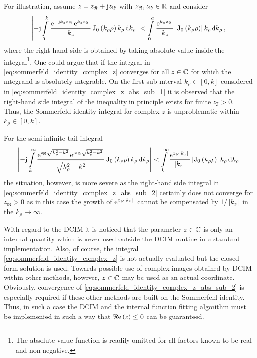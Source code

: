 For illustration, assume $z = z_\Re + \mathrm{j} z_\Im$ with $z_\Re, z_\Im \in \mathbb{R}$ and
consider
\begin{equation}\label{eq:sommerfeld_identity_complex_z_abs_sub_1}
	\left\vert
	-\mathrm{j}
	\int\limits_{0}^{k} 
	\frac{\mathrm{e}^{-\mathrm{j} k_z z_\Re}\, \mathrm{e}^{k_z z_\Im}\,}{k_z}
	\operatorname{J}_{0} \left(k_\rho \rho\right)
	k_\rho 
	\,
	\mathrm{d} k_\rho
	\right\vert
	<
	\int\limits_{0}^{a} 
	\frac{\mathrm{e}^{k_z z_\Im}\,}{k_z}
	\left\vert
	\operatorname{J}_{0} \left(k_\rho \rho\right)
	\right\vert
	k_\rho 
	\,
	\mathrm{d} k_\rho
	\, ,
\end{equation}
where the right-hand side is obtained by taking absolute value inside the
integral\footnote{The absolute value function is readily omitted for all factors
known to be real and non-negative.}.
One could argue that if the integral in
\eqref{eq:sommerfeld_identity_complex_z} converges for all $z \in \mathbb{C}$ for which
the integrand is absolutely integrable.
On the first sub-interval $k_\rho \in \left[0, k\right]$ considered in
\eqref{eq:sommerfeld_identity_complex_z_abs_sub_1} it is observed that 
the right-hand side integral of the inequality in principle exists
for finite $z_\Im > 0$.
Thus, the Sommerfeld identity integral for complex $z$ is unproblematic within
$k_\rho \in \left[0, k\right]$.

For the semi-infinite tail integral
\begin{equation}\label{eq:sommerfeld_identity_complex_z_abs_sub_2}
	\left\vert
	-\mathrm{j}
	\int\limits_{k}^{\infty} 
	\frac{
		\mathrm{e}^{z_\Re\sqrt{k_\rho^2 - k^2}}\,
		\mathrm{e}^{\mathrm{j} z_\Im \sqrt{k_\rho^2 - k^2}}\,
		}{\sqrt{k_\rho^2 - k^2}}
	\operatorname{J}_{0} \left(k_\rho \rho\right)
	k_\rho 
	\,
	\mathrm{d} k_\rho
	\right\vert
	<
	\int\limits_{k}^{\infty} 
	\frac{\mathrm{e}^{z_\Re \left\vert k_z\right\vert}\,}{\left\vert k_z\right\vert}
	\left\vert
	\operatorname{J}_{0} \left(k_\rho \rho\right)
	\right\vert
	k_\rho 
	\,
	\mathrm{d} k_\rho
\end{equation}
the situation, however, is more severe as the right-hand side integral in
\eqref{eq:sommerfeld_identity_complex_z_abs_sub_2} certainly does not converge
for $z_\Re > 0$ as in this case the growth of $\mathrm{e}^{z_\Re \left\vert k_z\right\vert}\,$ cannot be
compensated by $1 / \left\vert k_z\right\vert$ in the $k_\rho \to \infty$.

With regard to the \ac{DCIM} it is noticed that the parameter $z \in \mathbb{C}$
is only an internal quantity which is never used outside the \ac{DCIM} routine
in a standard implementation.
Also, of course, the integral \eqref{eq:sommerfeld_identity_complex_z} is not
actually evaluated but the closed form solution is used.
Towards possible use of complex images obtained by \ac{DCIM} within other
methods, however, $z \in \mathbb{C}$ may be used as an actual coordinate.
Obviously, convergence of \eqref{eq:sommerfeld_identity_complex_z_abs_sub_2} is
especially required if these other methods are built on the Sommerfeld identity.
Thus, in such a case the \ac{DCIM} and the internal function fitting algorithm
must be implemented in such a way that $\Re\mathrm{e}\left(z\right) \leq 0$ can be guaranteed.


